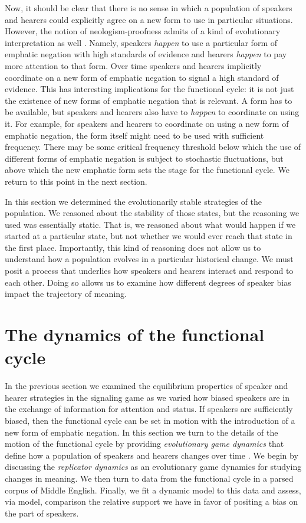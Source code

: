 \documentclass[linguex]{sp}
\theoremstyle{definition} \newtheorem{definition}{Definition}
\begin{document}
Now, it should be clear that there is no sense in which a population of speakers and hearers could explicitly agree on a new form to use in particular situations. However, the notion of neologism-proofness admits of a kind of evolutionary interpretation as well \citep[526]{farrell:1993}. Namely, speakers \emph{happen} to use a particular form of emphatic negation with high standards of evidence and hearers \emph{happen} to pay more attention to that form. Over time speakers and hearers implicitly coordinate on a new form of emphatic negation to signal a high standard of evidence. This has interesting implications for the functional cycle: it is not just the existence of new forms of emphatic negation that is relevant. A form has to be available, but speakers and hearers also have to \emph{happen} to coordinate on  using it. For example, for speakers and hearers to coordinate on using a new form of emphatic negation, the form itself might need to be used with sufficient frequency. There may be some critical frequency threshold below which the use of different forms of emphatic negation is subject to stochastic fluctuations, but above which the new emphatic form sets the stage for the functional cycle.  We return to this point in the next section.

In this section we determined the evolutionarily stable strategies of the population. We reasoned about the stability of those states, but the reasoning we used was essentially static. That is, we reasoned about what would happen if we started at a particular state, but not whether we would ever reach that state in the first place. Importantly, this kind of reasoning does not allow us to understand how a population evolves in a particular historical change. We must posit a process that underlies how speakers and hearers interact and respond to each other. Doing so allows us to examine how different degrees of speaker bias impact the trajectory of meaning. 


\section{The dynamics of the functional cycle}
\label{Dynamics}

In the previous section we examined the equilibrium properties of speaker and hearer strategies in the signaling game as we varied how biased speakers are in the exchange of information for attention and status. If speakers are sufficiently biased, then the functional cycle can be set in motion with the introduction of a new form of emphatic negation. In this section we turn to the details of the motion of the functional cycle by providing \emph{evolutionary game dynamics} that define how a population of speakers and hearers changes over time \citep{hofbauer-sigmund1998}. We begin by discussing the \emph{replicator dynamics} \citep{taylor-jonker:1978} as an evolutionary game dynamics for studying changes in meaning. We then turn to data from the functional cycle in a parsed corpus of Middle English. Finally, we fit a dynamic model to this data and assess, via model, comparison the relative support we have in favor of positing a bias on  the part of speakers.
\end{document}
